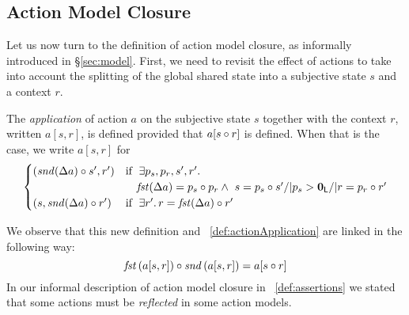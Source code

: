 \subsection{Action Model Closure}\label{subsec:closure}
Let us now turn to the definition of action model closure, as informally introduced in \S\ref{sec:model}. First, we need to revisit the effect of actions to take into account the splitting of the global shared state into a subjective state $s$ and a context $r$.
%
%
\begin{definition}\label{def:actionApplicationPair}
The \emph{application} of action $a$ on the subjective state $s$ together with the context $r$, written $a[s,r]$, is defined provided that $a[s \circ r]$ is defined.
When that is the case, we write $a[s,r]$ for
%
\[
\begin{cases}
	\left(\mathit{snd}(\Delta {a})\circ s',r'\right) &
	\text{if }\;\exists p_s, p_r, s', r'.\, \\
	&	\quad \mathit{fst}(\Delta {a}) = p_s\circ p_r \land\ s = p_s \circ s' /|   p_s > \mathbf{0}_{\mathsf{L}} /| r = p_r \circ r' \\
		
	\left(s, \mathit{snd}(\Delta {a})\circ r'\right) & 
	\text{if }\;\exists r'.\, r = \mathit{fst}(\Delta {a}) \circ r' 
\end{cases}
\]
%
\end{definition}
%
%
\noindent We observe that this new definition and ~\ref{def:actionApplication} are linked in the following way: 
%
\[
	\mathit{fst}\left(a[s, r]\right) \circ \mathit{snd}\left(a[s, r]\right) = a[s\circ r]
\]
%
In our informal description of action model closure in ~\ref{def:assertions} we stated that some actions must be \emph{reflected} in some action models. 
